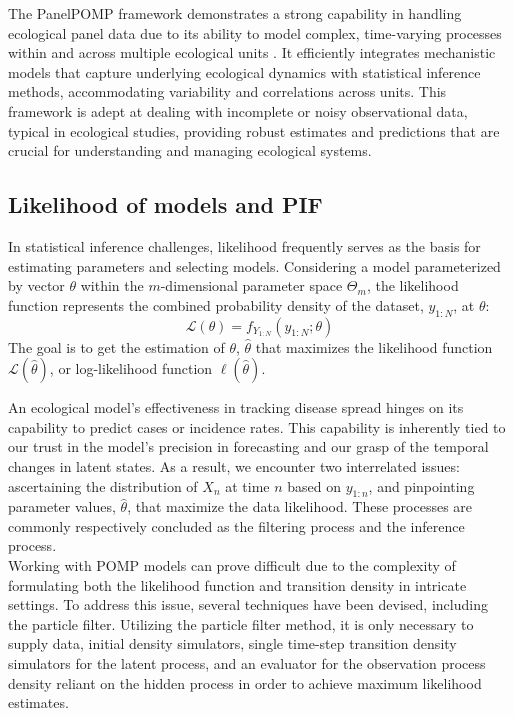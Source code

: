 \documentclass[12pt]{article}
\begin{document}
The PanelPOMP framework demonstrates a strong capability in handling ecological panel data due to its ability to model complex, time-varying processes within and across multiple ecological units \citep{Carles2020}. It efficiently integrates mechanistic models that capture underlying ecological dynamics with statistical inference methods, accommodating variability and correlations across units. This framework is adept at dealing with incomplete or noisy observational data, typical in ecological studies, providing robust estimates and predictions that are crucial for understanding and managing ecological systems.\\


\subsection{Likelihood of models and PIF}

In statistical inference challenges, likelihood frequently serves as the basis for estimating parameters and selecting models. Considering a model parameterized by vector $\theta$ within the $m$-dimensional parameter space $\Theta_m$, the likelihood function represents the combined probability density of the dataset, $y_{1:N}$, at $\theta$:
        \begin{equation}
        \mathcal{L}(\theta) = f_{Y_{1:N}}(y_{1:N}; \theta)
        \end{equation}
The goal is to get the estimation of $\theta$, $\hat{\theta}$ that maximizes the likelihood function $\mathcal{L}(\hat{\theta})$, or log-likelihood function $\mathbf{\ell}(\hat{\theta})$.

An ecological model's effectiveness in tracking disease spread hinges on its capability to predict cases or incidence rates. This capability is inherently tied to our trust in the model's precision in forecasting and our grasp of the temporal changes in latent states. As a result, we encounter two interrelated issues: ascertaining the distribution of $X_{n}$ at time $n$ based on $y_{1:n}$, and pinpointing parameter values, $\hat{\theta}$, that maximize the data likelihood. These processes are commonly respectively concluded as the filtering process and the inference process.\\

Working with POMP models can prove difficult due to the complexity of formulating both the likelihood function and transition density in intricate settings. To address this issue, several techniques have been devised, including the particle filter. Utilizing the particle filter method, it is only necessary to supply data, initial density simulators, single time-step transition density simulators for the latent process, and an evaluator for the observation process density reliant on the hidden process in order to achieve maximum likelihood estimates.\\
\end{document}
